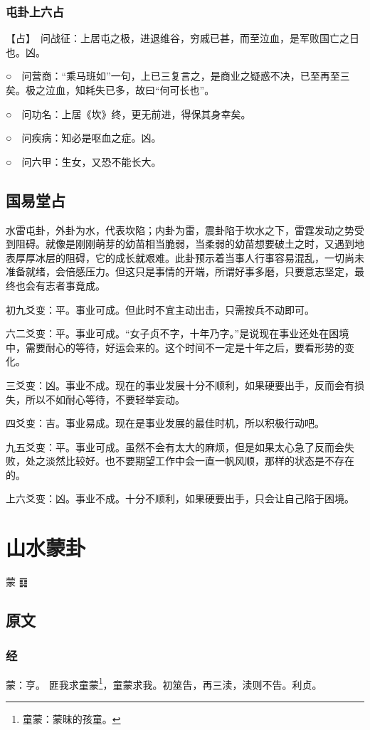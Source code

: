 \documentclass[12pt,oneside]{book}
\begin{document}
\subsection{屯卦上六占}
【占】　问战征：上居屯之极，进退维谷，穷戚已甚，而至泣血，是军败国亡之日也。凶。

○　问营商：“乘马班如”一句，上已三复言之，是商业之疑惑不决，已至再至三矣。极之泣血，知耗失已多，故曰“何可长也”。

○　问功名：上居《坎》终，更无前进，得保其身幸矣。

○　问疾病：知必是呕血之症。凶。

○　问六甲：生女，又恐不能长大。


\section{国易堂占}
水雷屯卦，外卦为水，代表坎陷；内卦为雷，震卦陷于坎水之下，雷霆发动之势受到阻碍。就像是刚刚萌芽的幼苗相当脆弱，当柔弱的幼苗想要破土之时，又遇到地表厚厚冰层的阻碍，它的成长就艰难。此卦预示着当事人行事容易混乱，一切尚未准备就绪，会倍感压力。但这只是事情的开端，所谓好事多磨，只要意志坚定，最终也会有志者事竟成。

初九爻变：平。事业可成。但此时不宜主动出击，只需按兵不动即可。

六二爻变：平。事业可成。“女子贞不字，十年乃字。”是说现在事业还处在困境中，需要耐心的等待，好运会来的。这个时间不一定是十年之后，要看形势的变化。

三爻变：凶。事业不成。现在的事业发展十分不顺利，如果硬要出手，反而会有损失，所以不如耐心等待，不要轻举妄动。

四爻变：吉。事业易成。现在是事业发展的最佳时机，所以积极行动吧。

九五爻变：平。事业可成。虽然不会有太大的麻烦，但是如果太心急了反而会失败，处之淡然比较好。也不要期望工作中会一直一帆风顺，那样的状态是不存在的。

上六爻变：凶。事业不成。十分不顺利，如果硬要出手，只会让自己陷于困境。


\chapter{山水蒙卦}
蒙 {\Large ䷃}

\section{原文}
\subsection{经}
蒙：亨。 匪我求童蒙\footnote{童蒙：蒙昧的孩童。}，童蒙求我。初筮告，再三渎，渎则不告。利贞。
\end{document}
